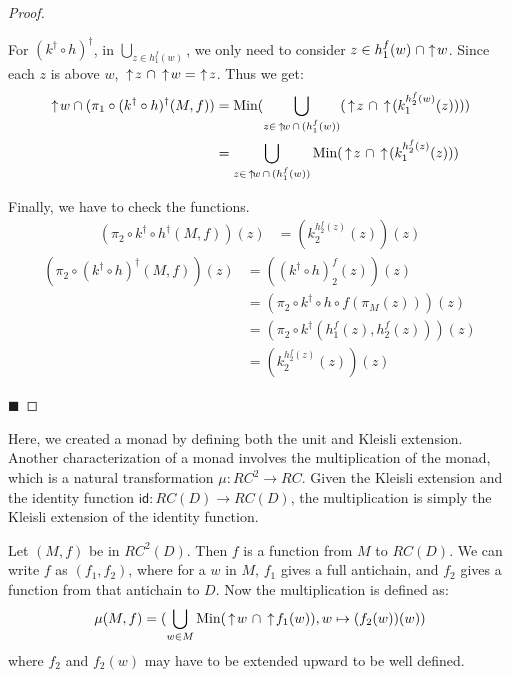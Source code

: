 \begin{proof}
\begin{description}
For $(k^\dagger\circ h)^\dagger$, in $\bigcup_{z\in h_1^f(w)}$, we only need to consider 
$z\in h_1^f(w)\; \cap\! \,\uparrow\! w$.  Since each $z$ is above $w$, $\,\uparrow\! z\ \cap \,\uparrow\! w =\, \,\uparrow\! z$.  Thus we get:
\begin{align*}
\ua w\cap (\pi_1\circ (k^\dagger\circ h)^\dagger (M,f))
&=\Min(\bigcup_{z\in \ua w\,\cap\,(h_1^f(w))}(\ua z\ \cap\ua(k_1^{h_2^f(w)}(z)))) \\
&= \bigcup_{z\in \ua w\,\cap\,(h_1^f(w))}\Min(\ua z\ \cap\ua(k_1^{h_2^f(z)}(z)))
\end{align*}

Finally, we have to check the functions.
\begin{align*}
(\pi_2\circ k^\dagger\circ h^\dagger(M,f))(z) &= (k_2^{h_2^f(z)}(z))(z)
\end{align*}
\begin{align*}
(\pi_2\circ (k^\dagger\circ h)^\dagger(M,f))(z) &= ((k^\dagger\circ h)_2^f(z))(z) \\
&= (\pi_2\circ k^\dagger\circ h\circ f(\pi_M(z)))(z) \\
&= (\pi_2\circ k^\dagger(h_1^f(z),h_2^f(z)))(z) \\
&= (k_2^{h_2^f(z)}(z))(z)
\end{align*}
\end{description} \hfill $\blacksquare$
\end{proof}

Here, we created a monad by defining both the unit and Kleisli extension.  Another characterization of a monad involves the multiplication of the monad, which is a natural transformation $\mu:RC^2 \to RC$.  Given the Kleisli extension and the identity function $\textsf{id}:RC(D)\to RC(D)$, the multiplication is simply the Kleisli extension of the identity function.

Let $(M,f)$ be in $RC^2(D)$. Then $f$ is a function from $M$ to $RC(D)$.  We can write $f$ as $(f_1, f_2)$, where for a $w$ in $M$, $f_1$ gives a full antichain, and $f_2$ gives a function from that antichain to $D$.  Now the multiplication is defined as:
\[\mu(M,f) = (\bigcup_{w\in M} \textrm{Min}(\,\uparrow\! w\ \cap \,\uparrow\! f_1(w)), w\mapsto (f_2(w))(w))\]
where $f_2$ and $f_2(w)$ may have to be extended upward to be well defined.



